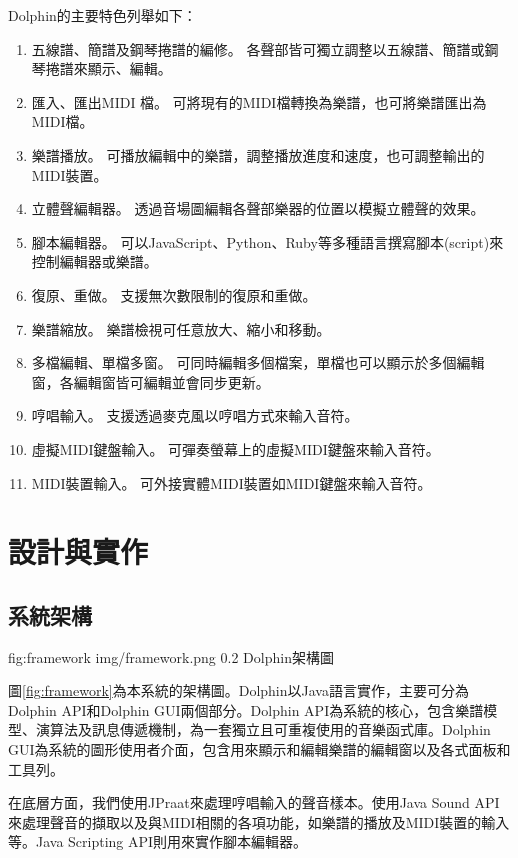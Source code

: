 \documentclass[12pt,a4paper,oneside]{report}
\begin{document}
Dolphin的主要特色列舉如下：
\begin{enumerate}
\item 五線譜、簡譜及鋼琴捲譜的編修。
      各聲部皆可獨立調整以五線譜、簡譜或鋼琴捲譜來顯示、編輯。
\item 匯入、匯出MIDI 檔。
      可將現有的MIDI檔轉換為樂譜，也可將樂譜匯出為MIDI檔。
\item 樂譜播放。
      可播放編輯中的樂譜，調整播放進度和速度，也可調整輸出的MIDI裝置。
\item 立體聲編輯器。
      透過音場圖編輯各聲部樂器的位置以模擬立體聲的效果。
\item 腳本編輯器。
      可以JavaScript、Python、Ruby等多種語言撰寫腳本(script)來控制編輯器或樂譜。
\item 復原、重做。
      支援無次數限制的復原和重做。
\item 樂譜縮放。
      樂譜檢視可任意放大、縮小和移動。
\item 多檔編輯、單檔多窗。
      可同時編輯多個檔案，單檔也可以顯示於多個編輯窗，各編輯窗皆可編輯並會同步更新。
\item 哼唱輸入。
      支援透過麥克風以哼唱方式來輸入音符。
\item 虛擬MIDI鍵盤輸入。
      可彈奏螢幕上的虛擬MIDI鍵盤來輸入音符。
\item MIDI裝置輸入。
      可外接實體MIDI裝置如MIDI鍵盤來輸入音符。 
\end{enumerate}


\chapter{設計與實作} %

\section{系統架構} %


\figurewithcaption
{fig:framework}
{img/framework.png}
{0.2}
{Dolphin架構圖}

圖\ref{fig:framework}為本系統的架構圖。Dolphin以Java語言實作，主要可分為Dolphin API和Dolphin GUI兩個部分。Dolphin API為系統的核心，包含樂譜模型、演算法及訊息傳遞機制，為一套獨立且可重複使用的音樂函式庫。Dolphin GUI為系統的圖形使用者介面，包含用來顯示和編輯樂譜的編輯窗以及各式面板和工具列。

在底層方面，我們使用JPraat來處理哼唱輸入的聲音樣本。使用Java Sound API來處理聲音的擷取以及與MIDI相關的各項功能，如樂譜的播放及MIDI裝置的輸入等。Java Scripting API則用來實作腳本編輯器。
\end{document}
